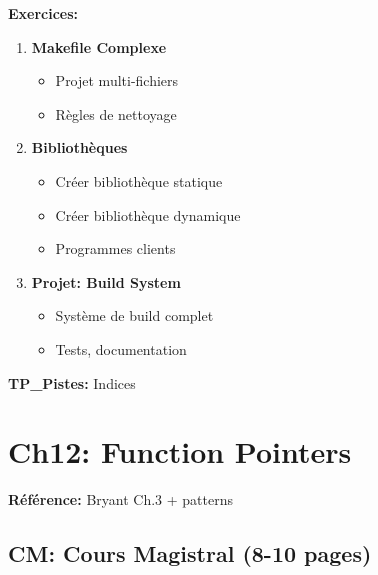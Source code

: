 \documentclass[10pt,a4paper]{article}
\begin{document}
\textbf{Exercices:}
\begin{enumerate}
\item \textbf{Makefile Complexe}
   \begin{itemize}
   \item Projet multi-fichiers
   \item Règles de nettoyage
   \end{itemize}

\item \textbf{Bibliothèques}
   \begin{itemize}
   \item Créer bibliothèque statique
   \item Créer bibliothèque dynamique
   \item Programmes clients
   \end{itemize}

\item \textbf{Projet: Build System}
   \begin{itemize}
   \item Système de build complet
   \item Tests, documentation
   \end{itemize}
\end{enumerate}

\textbf{TP\_Pistes:} Indices

\newpage

\section{Ch12: Function Pointers}

\textbf{Référence:} Bryant Ch.3 + patterns

\subsection*{CM: Cours Magistral (8-10 pages)}
\end{document}

